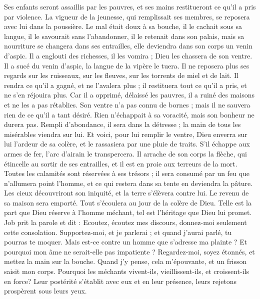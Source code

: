 \begin{multicols}{2}
Ses enfants seront assaillis par les pauvres, et ses mains restitueront ce qu'il a pris par violence.
La vigueur de la jeunesse, qui remplissait ses membres, se reposera avec lui dans la poussière.
Le mal était doux à sa bouche, il le cachait sous sa langue,
il le savourait sans l'abandonner, il le retenait dans son palais,
mais sa nourriture se changera dans ses entrailles, elle deviendra dans son corps un venin d'aspic.
Il a englouti des richesses, il les vomira ; Dieu les chassera de son ventre.
Il a sucé du venin d'aspic, la langue de la vipère le tuera.
Il ne reposera plus ses regards sur les ruisseaux, sur les fleuves, sur les torrents de miel et de lait.
Il rendra ce qu'il a gagné, et ne l'avalera plus ; il restituera tout ce qu'il a pris, et ne s'en réjouira plus.
Car il a opprimé, délaissé les pauvres, il a ruiné des maisons et ne les a pas rétablies.
Son ventre n'a pas connu de bornes ; mais il ne sauvera rien de ce qu'il a tant désiré.
Rien n'échappait à sa voracité, mais son bonheur ne durera pas.
Rempli d'abondance, il sera dans la détresse ; la main de tous les misérables viendra sur lui.
Et voici, pour lui remplir le ventre, Dieu enverra sur lui l'ardeur de sa colère, et le rassasiera par une pluie de traits.
S'il échappe aux armes de fer, l'arc d'airain le transpercera.
Il arrache de son corps la flèche, qui étincelle au sortir de ses entrailles, et il est en proie aux terreurs de la mort.
Toutes les calamités sont réservées à ses trésors ; il sera consumé par un feu que n'allumera point l'homme, et ce qui restera dans sa tente en deviendra la pâture.
Les cieux découvriront son iniquité, et la terre s'élèvera contre lui.
Le revenu de sa maison sera emporté. Tout s'écoulera au jour de la colère de Dieu.
Telle est la part que Dieu réserve à l'homme méchant, tel est l'héritage que Dieu lui promet.
\VerseOne{}Job prit la parole et dit :
Ecoutez, écoutez mes discours, donnez-moi seulement cette consolation.
Supportez-moi, et je parlerai ; et quand j'aurai parlé, tu pourras te moquer.
Mais est-ce contre un homme que s'adresse ma plainte ? Et pourquoi mon âme ne serait-elle pas impatiente ?
Regardez-moi, soyez étonnés, et mettez la main sur la bouche.
Quand j'y pense, cela m'épouvante, et un frisson saisit mon corps.
Pourquoi les méchants vivent-ils, vieillissent-ils, et croissent-ils en force?
Leur postérité s'établit avec eux et en leur présence, leurs rejetons prospèrent sous leurs yeux.

\end{multicols}
